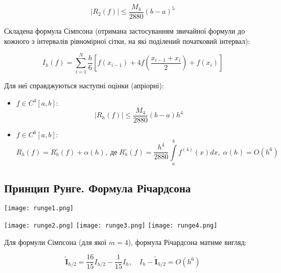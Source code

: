 \documentclass[12pt]{extarticle}
\newcommand{\<}{\langle}
\renewcommand{\>}{\rangle}
\theoremstyle{definition}
\newcommand{\thicktilde}[1]{\mathbf{\tilde{\text{$#1$}}}}
\begin{document}
\begin{equation}
	|R_{2}(f)|\leq \frac{M_{4}}{2880}(b-a)^{5}
\end{equation}

Складена формула Сімпсона (отримана застосуванням звичайної формули до кожного з інтервалів рівномірної сітки, на які поділений початковий інтервал):

\begin{equation}
	I_{h}(f) = \sum\limits_{i=1}^{N}\frac{h}{6}\left[f(x_{i-1}) + 4f(\frac{x_{i-1}+x_{i}}{2}) + f(x_{i})\right]
\end{equation}


Для неї справджуються наступні оцінки (апріорні):

\begin{itemize}

\item $f \in C^{4}[a,b]:$
\begin{equation}
|R_{h}(f)| \leq \frac{M_4}{2880}(b-a)h^4
\end{equation}

\item $f \in C^{6}[a,b]:$
\begin{equation}
 R_{h}(f)=R_{h}^{\circ}(f)+\alpha(h), \;  \text{де} \; R_{h}^{\circ}(f)=\frac{h^4}{2880}\int\limits_{a}^{b}f^{(4)}(x)dx, \; \alpha(h)=O(h^6) 
\end{equation}

\end{itemize}

\subsection{Принцип Рунге. Формула Річардсона}
\begin{center}
	\texttt{[image: runge1.png]}
\end{center}

\pagebreak

\begin{center}
	\texttt{[image: runge2.png]}
	\texttt{[image: runge3.png]}
	\texttt{[image: runge4.png]}
\end{center}

Для формули Сімпсона (для якої $m=4$), формула Річардсона матиме вигляд:

\begin{equation}
	\thicktilde{I}_{h/2}=\frac{16}{15}I_{h/2}-\frac{1}{15}I_{h}, \quad I_h-\thicktilde{I}_{h/2}=O(h^6)
\end{equation}
\end{document}
